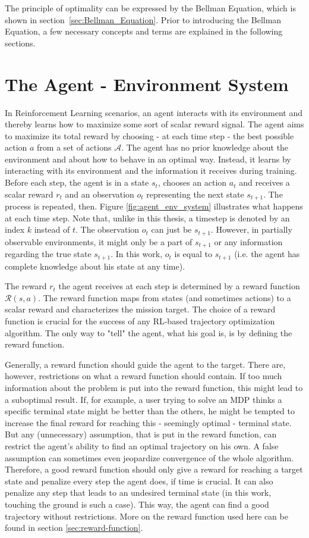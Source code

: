 The principle of optimality can be expressed by the Bellman Equation, which is shown in section~\ref{sec:Bellman_Equation}. Prior to introducing the Bellman Equation, a few necessary concepts and terms are explained in the following sections.

\section{The Agent - Environment System}

In Reinforcement Learning scenarios, an agent interacts with its environment and thereby learns how to maximize some sort of scalar reward signal. The agent aims to maximize its total reward by choosing - at each time step - the best possible action $a$ from a set of actions $\mathcal{A}$. 
The agent has no prior knowledge about the environment and about how to behave in an optimal way. Instead, it learns by interacting with its environment and the information it receives during training. Before each step, the agent is in a state $s_t$, chooses an action $a_t$ and receives a scalar reward $r_t$ and an observation $o_t$ representing the next state $s_{t+1}$. The process is repeated, then. Figure \ref{fig:agent_env_system} illustrates what happens at each time step. Note that, unlike in this thesis, a timestep is denoted by an index $k$ instead of $t$. The observation $o_t$ can just be $s_{t+1}$. However, in partially observable environments, it might only be a part of $s_{t+1}$ or any information regarding the true state $s_{t+1}$. In this work, $o_t$ is equal to $s_{t+1}$ (i.e. the agent has complete knowledge about his state at any time).

The reward $r_t$ the agent receives at each step is determined by a reward function $\mathcal{R}(s,a)$. The reward function maps from states (and sometimes actions) to a scalar reward and characterizes the mission target. The choice of a reward function is crucial for the success of any RL-based trajectory optimization algorithm. The only way to "tell" the agent, what his goal is, is by defining the reward function. 

Generally, a reward function should guide the agent to the target. There are, however, restrictions on what a reward function should contain. If too much information about the problem is put into the reward function, this might lead to a suboptimal result. If, for example, a user trying to solve an MDP thinks a specific terminal state might be better than the others, he might be tempted to increase the final reward for reaching this - seemingly optimal - terminal state. But any (unnecessary) assumption, that is put in the reward function, can restrict the agent's ability to find an optimal trajectory on his own. A false assumption can sometimes even jeopardize convergence of the whole algorithm. Therefore, a good reward function should only give a reward for reaching a target state and penalize every step the agent does, if time is crucial. It can also penalize any step that leads to an undesired terminal state (in this work, touching the ground is such a case). This way, the agent can find a good trajectory without restrictions. More on the reward function used here can be found in section \ref{sec:reward-function}.

